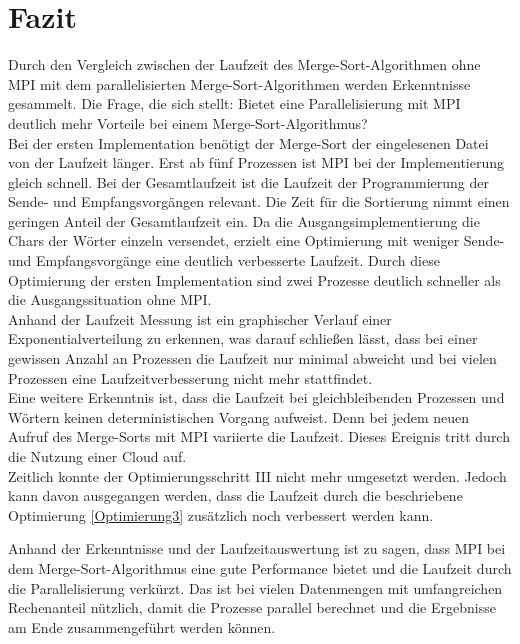 \section{Fazit}
Durch den Vergleich zwischen der Laufzeit des Merge-Sort-Algorithmen ohne MPI mit dem parallelisierten Merge-Sort-Algorithmen werden Erkenntnisse gesammelt. Die Frage, die sich stellt: Bietet eine Parallelisierung mit MPI deutlich mehr Vorteile bei einem Merge-Sort-Algorithmus?\\

Bei der ersten Implementation benötigt der Merge-Sort der eingelesenen Datei von der Laufzeit länger. Erst ab fünf Prozessen ist MPI bei der Implementierung gleich schnell.
Bei der Gesamtlaufzeit ist die Laufzeit der Programmierung der Sende- und Empfangsvorgängen relevant. Die Zeit für die Sortierung nimmt einen geringen Anteil der Gesamtlaufzeit ein.
Da die Ausgangsimplementierung die Chars der Wörter einzeln versendet, erzielt eine Optimierung mit weniger Sende- und Empfangsvorgänge eine deutlich verbesserte Laufzeit. Durch diese Optimierung der ersten Implementation sind zwei Prozesse deutlich schneller als die Ausgangssituation ohne MPI. \\
Anhand der Laufzeit Messung ist ein graphischer Verlauf einer Exponentialverteilung zu erkennen, was darauf schließen lässt, dass bei einer gewissen Anzahl an Prozessen die Laufzeit nur minimal abweicht und bei vielen Prozessen eine Laufzeitverbesserung nicht mehr stattfindet.\\
Eine weitere Erkenntnis ist, dass die Laufzeit bei gleichbleibenden Prozessen und Wörtern keinen deterministischen Vorgang aufweist. Denn bei jedem neuen Aufruf des Merge-Sorts mit MPI variierte die Laufzeit. Dieses Ereignis tritt durch die Nutzung einer Cloud auf.\\

Zeitlich konnte der Optimierungsschritt III nicht mehr umgesetzt werden. Jedoch kann davon ausgegangen werden, dass die Laufzeit durch die beschriebene Optimierung \ref{Optimierung3} zusätzlich noch verbessert werden kann.

Anhand der Erkenntnisse und der Laufzeitauswertung ist zu sagen, dass MPI bei dem Merge-Sort-Algorithmus eine gute Performance bietet und die Laufzeit durch die Parallelisierung verkürzt. Das ist bei vielen Datenmengen mit umfangreichen Rechenanteil nützlich, damit die Prozesse parallel berechnet und die Ergebnisse am Ende zusammengeführt werden können.